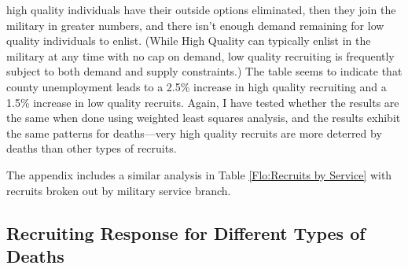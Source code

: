 \documentclass[12pt] {article}
\begin{document}
high quality individuals have their outside options eliminated, then
they join the military in greater numbers, and there isn't enough
demand remaining for low quality individuals to enlist. (While High
Quality can typically enlist in the military at any time with no cap
on demand, low quality recruiting is frequently subject to both demand
and supply constraints.) The table seems to indicate that county unemployment
leads to a 2.5\% increase in high quality recruiting and a 1.5\% increase
in low quality recruits. Again, I have tested whether the results are
the same when done using weighted least squares analysis, and the
results exhibit the same patterns for deaths---very high quality recruits
are more deterred by deaths than other types of recruits.

The appendix includes a similar analysis in Table \ref{Flo:Recruits by Service} with recruits broken out by military service branch.

\subsection{Recruiting Response for Different Types of Deaths\label{sub:Different Death Types}}
\end{document}
